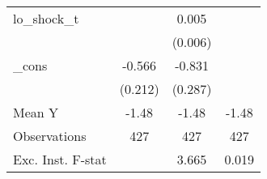 {\begin{tabular}{l*{3}{c}}
\addlinespace
lo\_shock\_t  &                     &       0.005         &                     \\
            &                     &     (0.006)         &                     \\
\addlinespace
\_cons      &      -0.566\sym{**} &      -0.831\sym{***}&                     \\
            &     (0.212)         &     (0.287)         &                     \\
\midrule
Mean Y      &       -1.48         &       -1.48         &       -1.48         \\
Observations&         427         &         427         &         427         \\
Exc. Inst. F-stat&                     &       3.665         &       0.019         \\
\bottomrule
\end{tabular}
}
